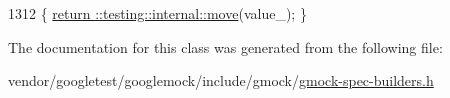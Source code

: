 \begin{DoxyCode}
1312 \{ \hyperlink{namespacetesting_1_1internal_a0f6d06bf8c3093b9c22bb08723db201e}{return ::testing::internal::move}(value\_); \}
\end{DoxyCode}


The documentation for this class was generated from the following file\+:\begin{DoxyCompactItemize}
\item 
vendor/googletest/googlemock/include/gmock/\hyperlink{gmock-spec-builders_8h}{gmock-\/spec-\/builders.\+h}\end{DoxyCompactItemize}
